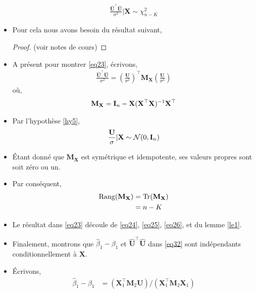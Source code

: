 \begin{frame}[allowframebreaks]
\begin{itemize}
\begin{align}
\frac{\widehat{\mathbf{U}}^\top\widehat{\mathbf{U}}}{\sigma^2} | \mathbf{X}\sim\chi^2_{n-K}
\label{eq23}
\end{align}
\item Pour cela nous avons besoin du résultat suivant,
\begin{proof}
(voir notes de cours)
\end{proof}
\item A présent pour montrer \eqref{eq23}, écrivons,
\begin{align}
\frac{\widehat{\mathbf{U}}^\top\widehat{\mathbf{U}}}{\sigma^2} = \left(\frac{\mathbf{U}}{\sigma^2}\right)^\top\mathbf{M}_\mathbf{X}\left(\frac{\mathbf{U}}{\sigma^2}\right)
\label{eq24}
\end{align}
où,
\begin{align*}
\mathbf{M}_\mathbf{X}=\mathbf{I}_n - \mathbf{X}(\mathbf{X}^\top\mathbf{X})^{-1}\mathbf{X}^\top
\end{align*}
\item Par l'hypothèse \ref{hy5},
\begin{align}
\frac{\mathbf{U}}{\sigma} | \mathbf{X}\sim\mathcal{N}(0, \mathbf{I}_n)
\label{eq25}
\end{align}
\item \'Etant donné que $\mathbf{M}_\mathbf{X}$ est symétrique et idempotente, ses valeurs propres sont soit zéro ou un. 
\item Par conséquent,
\begin{align}
\mathrm{Rang}(\mathbf{M}_\mathbf{X}) &= \mathrm{Tr}(\mathbf{M}_\mathbf{X}) \nonumber\\
&=n-K
\label{eq26}
\end{align}
\item Le résultat dans \eqref{eq23} découle de \eqref{eq24},  \eqref{eq25},  \eqref{eq26}, et du lemme \ref{le1}.
\item Finalement, montrons que $\widehat{\beta}_1 - \beta_1$ et $\widehat{\mathbf{U}}^\top\widehat{\mathbf{U}}$ dans \eqref{eq32} sont indépendants conditionnellement à $\mathbf{X}$. 
\item \'Ecrivons,
\begin{align*}
\widehat{\beta}_1-\beta_1 &= (\mathbf{X}_1^\top\mathbf{M}_2\mathbf{U})/(\mathbf{X}_1^\top\mathbf{M}_2\mathbf{X}_1)\\

\end{align*}
\end{itemize}
\end{frame}
